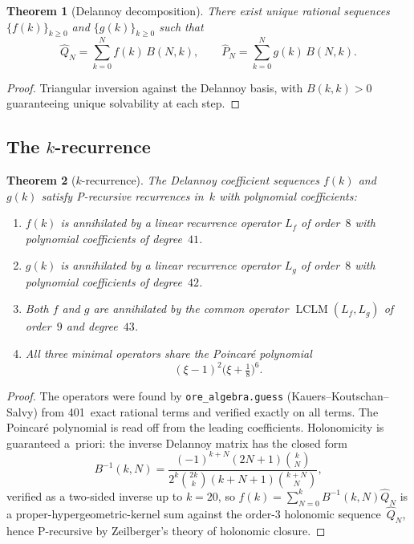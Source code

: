 \documentclass[11pt]{article}
\newtheorem{theorem}{Theorem}
\begin{document}
\begin{theorem}[Delannoy decomposition]\label{thm:delannoy-decomp}
There exist unique rational sequences $\{f(k)\}_{k\ge 0}$
and $\{g(k)\}_{k\ge 0}$ such that
\begin{equation}\label{eq:fk-decomp}
\hat Q_N = \sum_{k=0}^{N} f(k)\,B(N,k),\qquad
\hat P_N = \sum_{k=0}^{N} g(k)\,B(N,k).
\end{equation}
\end{theorem}

\begin{proof}
Triangular inversion against the Delannoy basis, with
$B(k,k)>0$ guaranteeing unique solvability at each step.
\end{proof}

\subsection{The $k$-recurrence}

\begin{theorem}[$k$-recurrence]\label{thm:k-rec}
The Delannoy coefficient sequences $f(k)$ and $g(k)$
satisfy P-recursive recurrences in~$k$ with polynomial
coefficients:
\begin{enumerate}
\item $f(k)$ is annihilated by a linear recurrence operator
  $L_f$ of order~$8$ with polynomial coefficients of degree~$41$.
\item $g(k)$ is annihilated by a linear recurrence operator
  $L_g$ of order~$8$ with polynomial coefficients of degree~$42$.
\item Both $f$ and $g$ are annihilated by the common operator
  $\operatorname{LCLM}(L_f, L_g)$ of order~$9$ and degree~$43$.
\item All three minimal operators share the Poincar\'e polynomial
\begin{equation}\label{eq:k-poincare}
(\xi - 1)^2\bigl(\xi + \tfrac{1}{8}\bigr)^6.
\end{equation}
\end{enumerate}
\end{theorem}

\begin{proof}
The operators were found by \texttt{ore\_algebra.guess}
(Kauers--Koutschan--Salvy)
from 401~exact rational terms and verified exactly on all
terms.  The Poincar\'e polynomial is read off from the
leading coefficients.  Holonomicity is guaranteed a~priori:
the inverse Delannoy matrix has the closed form
\[
B^{-1}(k,N) = \frac{(-1)^{k+N}(2N+1)\binom{k}{N}}
{2^k\binom{2k}{k}(k+N+1)\binom{k+N}{N}},
\]
verified as a two-sided inverse up to $k=20$, so
$f(k) = \sum_{N=0}^k B^{-1}(k,N)\hat Q_N$
is a proper-hypergeometric-kernel sum against the
order-3 holonomic sequence~$\hat Q_N$, hence P-recursive
by Zeilberger's theory of holonomic closure.
\end{proof}
\end{document}
